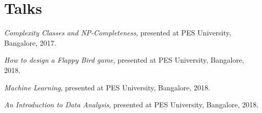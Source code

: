 \section{Talks}
 \resumeSubHeadingListStart
    \item
      {\textit{Complexity Classes and NP-Completeness}, presented at PES University, Bangalore, 2017.}
    \item
      {\textit{How to design a Flappy Bird game}, presented at PES University, Bangalore, 2018.}
    \item
      {\textit{Machine Learning}, presented at PES University, Bangalore, 2018.}
    \item
      {\textit{An Introduction to Data Analysis}, presented at PES University, Bangalore, 2018.}
 \resumeSubHeadingListEnd